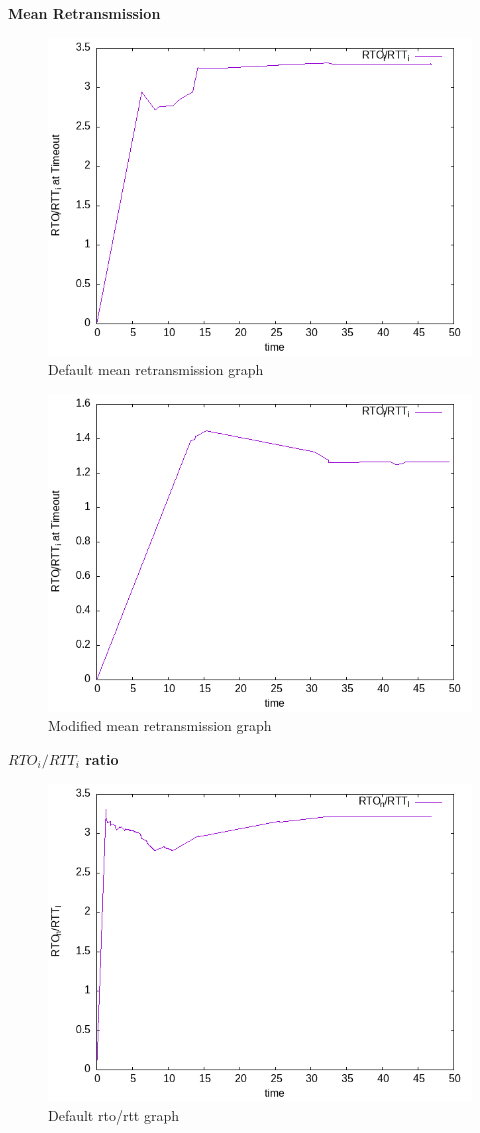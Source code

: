 \documentclass{article}[12pt]
\begin{document}
\newpage
\textbf{Mean Retransmission}
\begin{figure}[H]
	\centering
	\includegraphics[height=0.6\textwidth]{Pictures/rtt/175/b/mean_retransmission.png}
	\caption{Default mean retransmission graph}
\end{figure}   

\begin{figure}[H]
	\centering
	\includegraphics[height=.6\textwidth]{Pictures/rtt/175/m/mean_retransmission.png}
	\caption{Modified mean retransmission graph}
\end{figure}   

\newpage
\textbf{$RTO_i/RTT_i $ ratio}
\begin{figure}[H]
	\centering
	\includegraphics[height=0.6\textwidth]{Pictures/rtt/175/b/rto_by_rtt.png}
	\caption{Default rto/rtt graph}
\end{figure}   
\end{document}

